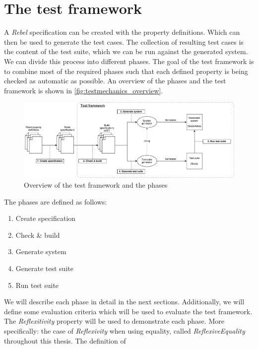 \section{The test framework}
A \textit{Rebel} specification can be created with the property definitions.
Which can then be used to generate the test cases. The collection of resulting
test cases is the content of the test suite, which we can be run against the
generated system. We can divide this process into different phases. The goal of
the test framework is to combine most of the required phases such that each
defined property is being checked as automatic as possible. An overview of the
phases and the test framework is shown in \autoref{fig:testmechanics_overview}.
\begin{figure}[!ht]
	\includegraphics[width=\linewidth]{figures/testmechanics_overview}
\caption{Overview of the test framework and the phases}
\label{fig:testmechanics_overview}
\centering
\end{figure}
\FloatBarrier\noindent
The phases are defined as follows:
\def \tfPhaseOne{Create specification}
\def \tfPhaseTwo{Check \& build}
\def \tfPhaseThree{Generate system}
\def \tfPhaseFour{Generate test suite}
\def \tfPhaseFive{Run test suite}
\begin{enumerate}
  \item \tfPhaseOne{}
  \item \tfPhaseTwo{}
  \item \tfPhaseThree{}
  \item \tfPhaseFour{}
  \item \tfPhaseFive{}
\end{enumerate}
We will describe each phase in detail in the next sections. Additionally, we
will define some evaluation criteria which will be used to evaluate the test
framework. The \textit{Reflexitivity} property will be used to demonstrate each
phase. More specifically: the case of \textit{Reflexivity} when using equality,
called \textit{ReflexiveEquality} throughout this thesis. The definition of
